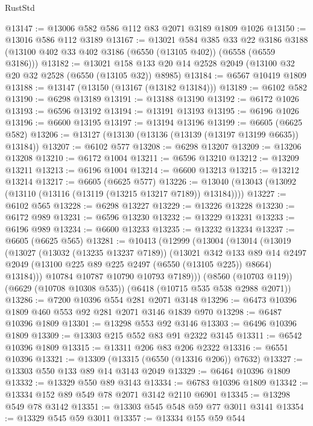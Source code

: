 \begin{lexlean}{RustStd}
\begin{coremodule}
@13147 := @13006 @582 @586 @112 @83 @2071 @3189 @1809 @1026
@13150 := @13016 @586 @112 @3189
@13167 := @13021
    @584
    @385
    @33
    @22
    @3186
    @3188
    (@13100 @402 @33 @402 @3186 (@6550 (@13105 @402)) (@6558 (@6559 @3186)))
@13182 := @13021 @158 @133 @20 @14 @2528 @2049 (@13100 @32 @20 @32 @2528 (@6550 (@13105 @32)) @8985)
@13184 := @6567 @10419 @1809
@13188 := @13147 (@13150 (@13167 (@13182 @13184)))
@13189 := @6102 @582
@13190 := @6298 @13189
@13191 := @13188 @13190
@13192 := @6172 @1026
@13193 := @6596 @13192
@13194 := @13191 @13193
@13195 := @6196 @1026
@13196 := @6600 @13195
@13197 := @13194 @13196
@13199 := @6605 (@6625 @582)
@13206 := @13127 (@13130 (@13136 (@13139 (@13197 @13199 @6635)) @13184))
@13207 := @6102 @577
@13208 := @6298 @13207
@13209 := @13206 @13208
@13210 := @6172 @1004
@13211 := @6596 @13210
@13212 := @13209 @13211
@13213 := @6196 @1004
@13214 := @6600 @13213
@13215 := @13212 @13214
@13217 := @6605 (@6625 @577)
@13226 := @13040 (@13043 (@13092 (@13110 (@13116 (@13119 (@13215 @13217 @7189)) @13184))))
@13227 := @6102 @565
@13228 := @6298 @13227
@13229 := @13226 @13228
@13230 := @6172 @989
@13231 := @6596 @13230
@13232 := @13229 @13231
@13233 := @6196 @989
@13234 := @6600 @13233
@13235 := @13232 @13234
@13237 := @6605 (@6625 @565)
@13281 := @10413
    (@12999
      (@13004
        (@13014
          (@13019
            (@13027
              (@13032 (@13235 @13237 @7189))
              (@13021
                @342
                @133
                @89
                @14
                @2497
                @2049
                (@13100 @225 @89 @225 @2497 (@6550 (@13105 @225)) @8664)
                @13184)))
          @10784
          @10787
          @10790
          @10793
          @7189)))
    (@8560 (@10703 @119))
    (@6629 (@10708 @10308 @535))
    (@6418 (@10715 @535 @538 @2988 @2071))
@13286 := @7200 @10396 @554 @281 @2071 @3148
@13296 := @6473 @10396 @1809 @460 @553 @92 @281 @2071 @3146 @1839 @970
@13298 := @6487 @10396 @1809
@13301 := @13298 @553 @92 @3146
@13303 := @6496 @10396 @1809
@13309 := @13303 @215 @552 @83 @91 @2322 @3145
@13311 := @6542 @10396 @1809
@13315 := @13311 @206 @83 @206 @2322
@13316 := @6551 @10396
@13321 := @13309 (@13315 (@6550 (@13316 @206)) @7632)
@13327 := @13303 @550 @133 @89 @14 @3143 @2049
@13329 := @6464 @10396 @1809
@13332 := @13329 @550 @89 @3143
@13334 := @6783 @10396 @1809
@13342 := @13334 @152 @89 @549 @78 @2071 @3142 @2110 @6901
@13345 := @13298 @549 @78 @3142
@13351 := @13303 @545 @548 @59 @77 @3011 @3141
@13354 := @13329 @545 @59 @3011
@13357 := @13334 @155 @59 @544

\end{coremodule}
\end{lexlean}
